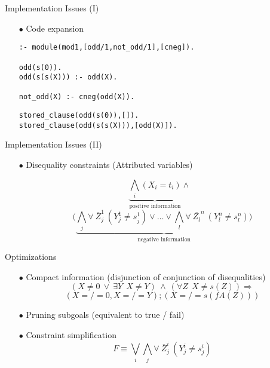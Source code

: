 \documentclass[pdf,slideColor,contemporain]{prosper}
\begin{document}

\begin{slide}{Implementation Issues (I)}
     \begin{itemize}
        \item[$\bullet$] {\blue Code expansion}
\begin{small}
\begin{verbatim}
:- module(mod1,[odd/1,not_odd/1],[cneg]).

odd(s(0)).
odd(s(s(X))) :- odd(X).

not_odd(X) :- cneg(odd(X)).
\end{verbatim}
{\blue
\begin{verbatim}
stored_clause(odd(s(0)),[]).
stored_clause(odd(s(s(X))),[odd(X)]).

\end{verbatim}}
\end{small}
     \end{itemize}
\end{slide}

\begin{slide}{Implementation Issues (II)}
     \begin{itemize}

        \item[$\bullet$] {\blue Disequality constraints} (Attributed variables) \\
\begin{small}

\[ \underbrace{\bigwedge_i (X_i = t_i)}_{\mbox{positive information}} \wedge~~~\] 
\[(
\underbrace{\bigwedge_j \forall~ \overline{Z}_j^1~(Y_j^1 \neq s_j^1)
\vee \ldots \vee \bigwedge_l \forall~ \overline{Z_l}^n~(Y_l^n
\neq s_l^n) )}_{\mbox{negative information}} \]


\end{small}

     \end{itemize}
\end{slide}
\begin{slide}{Optimizations}
     \begin{itemize}

        \item[$\bullet$] {\blue Compact information} (disjunction of conjunction of disequalities) 
\vspace{-0.2cm}
\[ (X \neq 0 ~\vee~ \exists Y ~~ X \neq Y) ~\wedge~ (\forall Z ~~ X \neq s(Z)) \Rightarrow \]
\[ (X=/=0, X=/=Y);(X=/=s(fA(Z))) \]
        \item[$\bullet$] {\blue Pruning subgoals} (equivalent to true / fail) 
        \item[$\bullet$] {\blue Constraint simplification}
\[ F \equiv  \bigvee_i\bigwedge_j \forall~ \overline{Z}_j^i~(Y_j^i \neq s_j^i) \]

     \end{itemize}
\end{slide}
\end{document}
